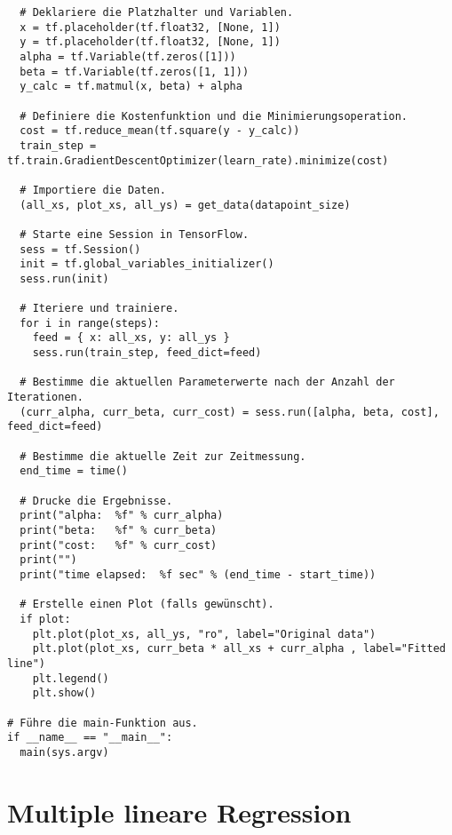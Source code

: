 \begin{verbatim}
  # Deklariere die Platzhalter und Variablen.
  x = tf.placeholder(tf.float32, [None, 1])
  y = tf.placeholder(tf.float32, [None, 1])
  alpha = tf.Variable(tf.zeros([1]))
  beta = tf.Variable(tf.zeros([1, 1]))
  y_calc = tf.matmul(x, beta) + alpha

  # Definiere die Kostenfunktion und die Minimierungsoperation.
  cost = tf.reduce_mean(tf.square(y - y_calc))
  train_step = tf.train.GradientDescentOptimizer(learn_rate).minimize(cost)

  # Importiere die Daten.
  (all_xs, plot_xs, all_ys) = get_data(datapoint_size)

  # Starte eine Session in TensorFlow.
  sess = tf.Session()
  init = tf.global_variables_initializer()
  sess.run(init)

  # Iteriere und trainiere.
  for i in range(steps):
    feed = { x: all_xs, y: all_ys }
    sess.run(train_step, feed_dict=feed)

  # Bestimme die aktuellen Parameterwerte nach der Anzahl der Iterationen.
  (curr_alpha, curr_beta, curr_cost) = sess.run([alpha, beta, cost], feed_dict=feed)

  # Bestimme die aktuelle Zeit zur Zeitmessung.
  end_time = time()

  # Drucke die Ergebnisse.
  print("alpha:  %f" % curr_alpha)
  print("beta:   %f" % curr_beta)
  print("cost:   %f" % curr_cost)
  print("")
  print("time elapsed:  %f sec" % (end_time - start_time))

  # Erstelle einen Plot (falls gewünscht).
  if plot:
    plt.plot(plot_xs, all_ys, "ro", label="Original data")
    plt.plot(plot_xs, curr_beta * all_xs + curr_alpha , label="Fitted line")
    plt.legend()
    plt.show()

# Führe die main-Funktion aus.
if __name__ == "__main__":
  main(sys.argv)
\end{verbatim}

\section{Multiple lineare Regression}
\label{appendix:C:2}

